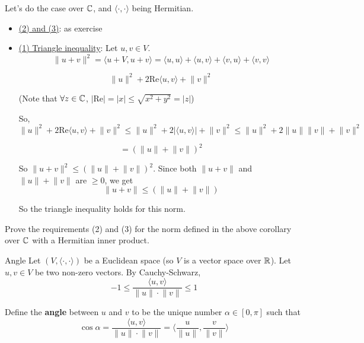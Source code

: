 \documentclass[12pt]{article}
\begin{document}
\begin{proofbox}
    Let's do the case over $\mathbb{C}$, and $\langle \cdot, \cdot \rangle$ being Hermitian.
    
    \begin{itemize}
        \item \underline{(2) and (3)}: as exercise
        \item \underline{(1) Triangle inequality}: Let $u, v \in V$.
        $$
            \lVert u + v \rVert^2 = \langle u + V, u + v \rangle = \langle u, u \rangle + \langle u, v \rangle + \langle v, u \rangle + \langle v, v \rangle
        $$

        $$  
            \lVert u \rVert^2 + 2 \mathrm{Re} \langle u, v \rangle + \lVert v \rVert^2
        $$

        (Note that $\forall z \in \mathbb{C}$, $|\mathrm{Re}| = |x| \leq \sqrt{x^2+y^2} = |z|$)

        So, 
        $$
             \lVert u \rVert^2 + 2 \mathrm{Re} \langle u, v \rangle + \lVert v \rVert^2 \leq \lVert u \rVert^2 + 2 |\langle u, v \rangle| + \lVert v \rVert^2 \leq \lVert u \rVert^2 + 2 \lVert u \rVert \lVert v \rVert + \lVert v \rVert^2
        $$

        $$
            = \left(\lVert u \rVert + \lVert v \rVert\right)^2
        $$

        So $\lVert u + v \rVert^2 \leq \left(\lVert u \rVert + \lVert v \rVert\right)^2$. Since both $\lVert u + v \rVert$ and $\lVert u \rVert + \lVert v \rVert$ are $\geq 0$, we get
        $$
            \lVert u + v \rVert \leq \left(\lVert u \rVert + \lVert v \rVert\right)
        $$

        So the triangle inequality holds for this norm.
    \end{itemize}
\end{proofbox}

\begin{exercise}{}{}
    Prove the requirements (2) and (3) for the norm defined in the above corollary over $\mathbb{C}$ with a Hermitian inner product.
\end{exercise}

\begin{definition}{Angle}{}
    Let $(V, \langle \cdot, \cdot \rangle)$ be a Euclidean space (so $V$ is a vector space over $\mathbb{R}$). Let $u, v \in V$ be two non-zero vectors. By Cauchy-Schwarz,
    $$
        -1 \leq \frac{\langle u, v \rangle}{\lVert u \rVert \cdot \lVert v \rVert} \leq 1
    $$

    Define the \textbf{angle} between $u$ and $v$ to be the unique number $\alpha \in [0, \pi]$ such that 
    $$
        \cos \alpha = \frac{\langle u, v \rangle}{\lVert u \rVert \cdot \lVert v \rVert} = \langle \frac{u}{\lVert u \rVert}, \frac{v}{\lVert v \rVert} \rangle
    $$
\end{definition}
\end{document}
